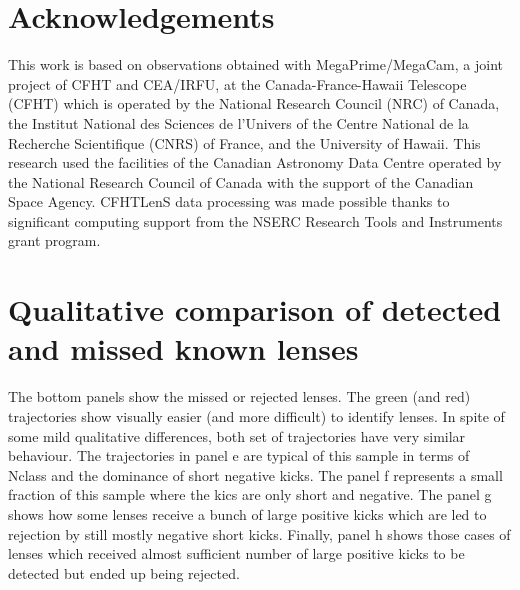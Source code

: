 \documentclass[useAMS,usenatbib,a4paper]{mn2e}
\begin{document}
\twocolumn

\section*{Acknowledgements}


This work is based on observations obtained with MegaPrime/MegaCam, a joint
project of CFHT and CEA/IRFU, at the Canada-France-Hawaii Telescope (CFHT) which
is operated by the National Research Council (NRC) of Canada, the Institut
National des Sciences de l'Univers of the Centre National de la Recherche
Scientifique (CNRS) of France, and the University of Hawaii. This research used
the facilities of the Canadian Astronomy Data Centre operated by the National
Research Council of Canada with the support of the Canadian Space Agency.
CFHTLenS data processing was made possible thanks to significant computing
support from the NSERC Research Tools and Instruments grant program.


\appendix

\section{Qualitative comparison of detected and missed known lenses}
\label{appendix:traj}

The bottom panels show the missed or rejected lenses. The green (and red)
trajectories show visually easier (and more difficult) to identify
lenses. In spite of some mild qualitative differences, both set of
trajectories have very similar behaviour. The trajectories in panel e
are typical of this sample in terms of Nclass and the dominance of short
negative kicks. The panel f represents a small fraction of this sample
where the kics are only short and negative. The panel g shows how some
lenses receive a bunch of large positive kicks which are led to
rejection by still mostly negative short kicks. Finally, panel h shows
those cases of lenses which received almost sufficient number of large
positive kicks to be detected but ended up being rejected.
\end{document}
